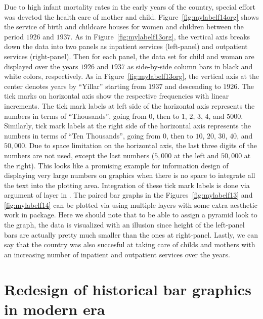 Due to high infant mortality rates in the early years of the country, special effort was devetod the health care of mother and child.
Figure~\ref{fig:mylabelf14org} shows the service of birth and childcare houses for women and children between the period $1926$ and $1937$. As in Figure~\ref{fig:mylabelf13org}, the vertical axis breaks down the data into two panels as inpatient services (left-panel) and outpatient services (right-panel). Then for each panel, the data set for child and woman are displayed over the years $1926$ and $1937$ as side-by-side column bars in black and white colors, respectively. As in Figure~\ref{fig:mylabelf13org}, 
the vertical axis at the center denotes years by \enquote{Yillar} starting from $1937$ and descending to $1926$. The tick marks on horizontal axis show the respective frequencies with linear increments. The tick mark labels at left side of the horizontal axis represents the numbers in terms of \enquote{Thousands}, going from $0$, then to $1$, $2$, $3$, $4$, and $5000$. Similarly, tick mark labels at the right side of the horizontal axis represents the numbers in terms of
\enquote{Ten Thousands}, going from $0$, then to $10$, $20$, $30$, $40$, and $50,000$. Due to space limitation on the horizontal axis, the last three digits of the numbers are not used, except the last numbers ($5,000$ at the left and $50,000$ at the right). This looks like a promising example for information design of displaying very large numbers on graphics when there is no space to integrate all the text into the plotting area. Integration of these tick mark labels is done via  argument of  layer in . The paired bar graphs in the Figures~\ref{fig:mylabelf13} and \ref{fig:mylabelf14} can be plotted
via using multiple  layers with some extra aesthetic work in  package. Here we should note that to be able to assign a pyramid look to the graph, the data is visualized with an illusion since height of the left-panel bars are actually pretty much smaller than the ones at right-panel.
Lastly, we can say that the country was also succesful at taking care of childs and mothers with an increasing number of inpatient and outpatient services over the years.


\section{Redesign of historical bar graphics in modern era}
\label{sec:redesign}


